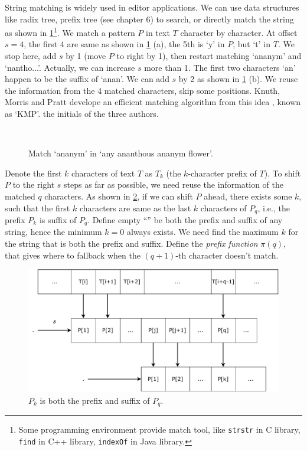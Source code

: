 \documentclass[b5paper]{article}
\begin{document}
 
String matching is widely used in editor applications. We can use data structures like radix tree, prefix tree (see chapter 6) to search, or directly match the string as shown in \cref{fig:strstr}\footnote{Some programming environment provide match tool, like \texttt{strstr} in C library, \texttt{find} in C++ library, \texttt{indexOf} in Java library.}. We match a pattern $P$ in text $T$ character by character. At offset $s = 4$, the first 4 are same as shown in \cref{fig:strstr} (a), the 5th is `y' in $P$, but `t' in $T$. We stop here, add $s$ by 1 (move $P$ to right by 1), then restart matching `ananym' and `nantho...'. Actually, we can increase $s$ more than 1. The first two characters `an' happen to be the suffix of `anan'. We can add $s$ by 2 as shown in \cref{fig:strstr} (b). We reuse the information from the 4 matched characters, skip some positions. Knuth, Morris and Pratt develope an efficient matching algorithm from this idea \cite{kmp}, known as `KMP'. the initials of the three authors.

\begin{figure}[htbp]
 \centering
  \\
 \caption{Match `ananym' in `any ananthous ananym flower'.}
 \label{fig:strstr}
\end{figure}

Denote the first $k$ characters of text $T$ as $T_k$ (the $k$-character prefix of $T$). To shift $P$ to the right $s$ steps as far as possible, we need reuse the information of the matched $q$ characters. As shown in \cref{fig:kmp-fallback}, if we can shift $P$ ahead, there exists some $k$, such that the first $k$ characters are same as the last $k$ characters of $P_q$, i.e., the prefix $P_k$ is suffix of $P_q$. Define empty ``'' be both the prefix and suffix of any string, hence the minimum $k = 0$ always exists. We need find the maximum $k$ for the string that is both the prefix and suffix. Define the {\em prefix function} $\pi(q)$, that gives where to fallback when the $(q + 1)$-th character doesn't match\cite{CLRS}.

\begin{figure}[htbp]
 \centering
 \includegraphics[scale=0.45]{img/kmp-fallback}
 \caption{$P_k$ is both the prefix and suffix of $P_q$.}
 \label{fig:kmp-fallback}
\end{figure}
\end{document}
